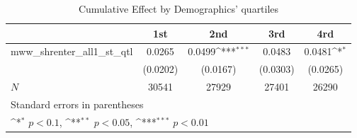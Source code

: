 \begin{table}[htbp]\centering
\def\sym#1{\ifmmode^{#1}\else\(^{#1}\)\fi}
\caption{Cumulative Effect by Demographics' quartiles}
\begin{tabular}{l*{4}{c}}
\hline\hline
            &\multicolumn{1}{c}{1st}&\multicolumn{1}{c}{2nd}&\multicolumn{1}{c}{3rd}&\multicolumn{1}{c}{4rd}\\
\hline
mww\_shrenter\_all1\_st\_qtl&      0.0265         &      0.0499\sym{***}&      0.0483         &      0.0481\sym{*}  \\
            &    (0.0202)         &    (0.0167)         &    (0.0303)         &    (0.0265)         \\
\hline
\(N\)       &       30541         &       27929         &       27401         &       26290         \\
\hline\hline
\multicolumn{5}{l}{\footnotesize Standard errors in parentheses}\\
\multicolumn{5}{l}{\footnotesize \sym{*} \(p<0.1\), \sym{**} \(p<0.05\), \sym{***} \(p<0.01\)}\\
\end{tabular}
\end{table}
